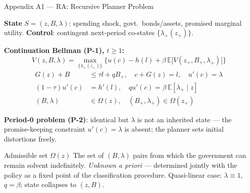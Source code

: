 \documentclass[10pt,aspectratio=169]{beamer}
\begin{document}
\begin{frame}[label=appRAprob]{Appendix A1 --- RA: Recursive Planner Problem}
\hfill\hyperlink{mainRAalgo}{}
\vspace{0.2em}

\textbf{State} $S=(z,B,\lambda)$: spending shock, govt.\ bonds/assets, promised marginal utility.
\textbf{Control}: contingent next-period co-states $\{\lambda_+(z_+)\}$.

\smallskip
\textbf{Continuation Bellman (P-1), $t\ge1$:}
\vspace{-0.2cm}
\[
V(z,B,\lambda)=\max_{\{\lambda_+(z_+)\}}\Big\{u(c)-h(l)+\beta\,\mathbb{E}\big[V(z_+,B_+,\lambda_+)\big]\Big\}
\]
\vspace{-0.4cm}
\begin{align*}
G(z)+B &\le \tau l + qB_+, \quad c+G(z)=l, \quad u'(c)=\lambda \\
(1-\tau)u'(c)&=h'(l), \quad qu'(c)=\beta\,\mathbb{E}[\lambda_+\mid z]\\
(B,\lambda)&\in\Omega(z), \quad (B_+,\lambda_+)\in\Omega(z_+)
\end{align*}

\textbf{Period-0 problem (P-2)}: identical but $\lambda$ is not an inherited state --- the promise-keeping
constraint $u'(c)=\lambda$ is absent; the planner sets initial distortions freely.

\smallskip
\begin{block}{Admissible set $\Omega(z)$}
\small The set of $(B,\lambda)$ pairs from which the government can remain solvent indefinitely.
\emph{Unknown a priori} --- determined jointly with the policy as a fixed point of the
classification procedure. Quasi-linear case: $\lambda\equiv1$, $q=\beta$; state collapses to $(z,B)$.
\end{block}
\end{frame}
\end{document}
